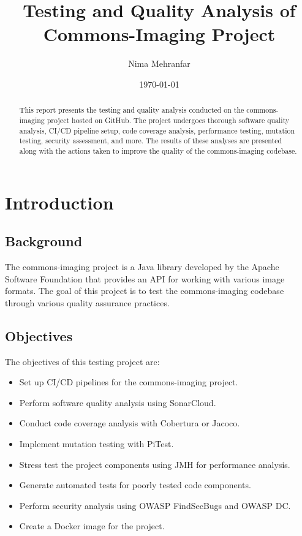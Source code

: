 \documentclass[a4paper,12pt]{report}
\title{Testing and Quality Analysis of Commons-Imaging Project}
\author{Nima Mehranfar}
\date{\today}
\begin{document}
\maketitle

\begin{abstract}
    This report presents the testing and quality analysis conducted on the commons-imaging project hosted on GitHub. The project undergoes thorough software quality analysis, CI/CD pipeline setup, code coverage analysis, performance testing, mutation testing, security assessment, and more. The results of these analyses are presented along with the actions taken to improve the quality of the commons-imaging codebase.
\end{abstract}

\tableofcontents
\newpage

\chapter{Introduction}
\section{Background}
The commons-imaging project is a Java library developed by the Apache Software Foundation that provides an API for working with various image formats. The goal of this project is to test the commons-imaging codebase through various quality assurance practices.

\section{Objectives}
The objectives of this testing project are:
\begin{itemize}
    \item Set up CI/CD pipelines for the commons-imaging project.
    \item Perform software quality analysis using SonarCloud.
    \item Conduct code coverage analysis with Cobertura or Jacoco.
    \item Implement mutation testing with PiTest.
    \item Stress test the project components using JMH for performance analysis.
    \item Generate automated tests for poorly tested code components.
    \item Perform security analysis using OWASP FindSecBugs and OWASP DC.
    \item Create a Docker image for the project.
\end{itemize}
\end{document}
